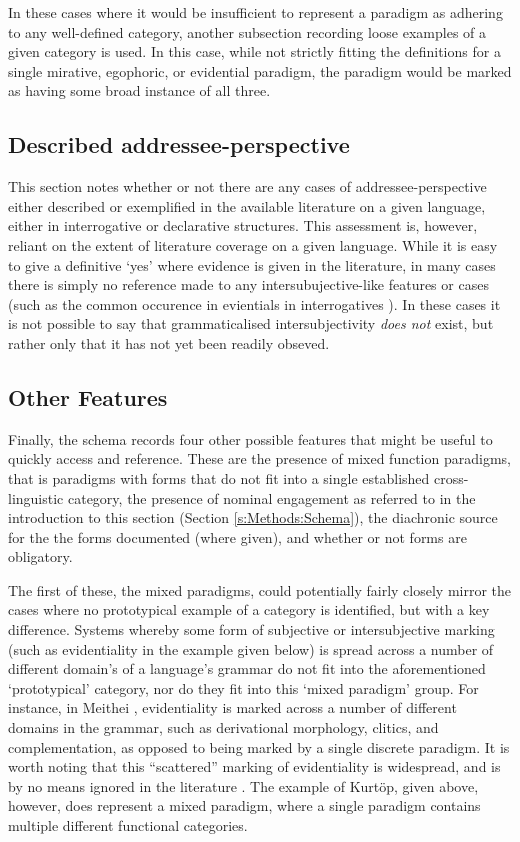 In these cases where it would be insufficient to represent a paradigm as adhering to any well-defined category, another subsection recording loose examples of a given category is used. In this case, while not strictly fitting the definitions for a single mirative, egophoric, or evidential paradigm, the paradigm would be marked as having some broad instance of all three.

\subsection{Described addressee-perspective}
This section notes whether or not there are any cases of addressee-perspective either described or exemplified in the available literature on a given language, either in interrogative or declarative structures. This assessment is, however, reliant on the extent of literature coverage on a given language. While it is easy to give a definitive `yes' where evidence is given in the literature, in many cases there is simply no reference made to any intersubujective-like features or cases (such as the common occurence in evientials in interrogatives \cite{Aikhenvald2018Intro}). In these cases it is not possible to say that grammaticalised intersubjectivity \textit{does not} exist, but rather only that it has not yet been readily obseved.

\subsection{Other Features}
Finally, the schema records four other possible features that might be useful to quickly access and reference. These are the presence of mixed function paradigms, that is paradigms with forms that do not fit into a single established cross-linguistic category, the presence of nominal engagement as referred to in the introduction to this section (Section \ref{s:Methods:Schema}), the diachronic source for the the forms documented (where given), and whether or not forms are obligatory.

The first of these, the mixed paradigms, could potentially fairly closely mirror the cases where no prototypical example of a category is identified, but with a key difference. Systems whereby some form of subjective or intersubjective marking (such as evidentiality in the example given below) is spread across a number of different domain's of a language's grammar do not fit into the aforementioned `prototypical' category, nor do they fit into this `mixed paradigm' group. For instance, in Meithei \cite[295]{Chelliah1997}, evidentiality is marked across a number of different domains in the grammar, such as derivational morphology, clitics, and complementation, as opposed to being marked by a single discrete paradigm. It is worth noting that this ``scattered'' marking of evidentiality is widespread, and is by no means ignored in the literature \cite[23]{Aikhenvald2014}. The example of Kurtöp, given above, however, does represent a mixed paradigm, where a single paradigm contains multiple different functional categories.

